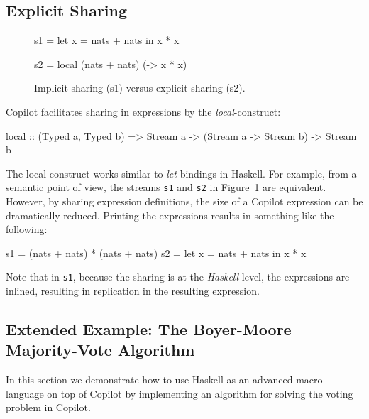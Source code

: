 \subsection{Explicit Sharing}
\label{sec:explicit_sharing}

\begin{figure}[ht]
\begin{minipage}{0.25\textwidth}
\begin{code}
s1 = let x = nats + nats
     in x * x
\end{code}
\end{minipage}%
\begin{minipage}{0.25\textwidth}
\begin{code}
s2 = local (nats + nats)
      (\x -> x * x)
\end{code}
\end{minipage}
\caption{Implicit sharing (s1) versus explicit sharing (s2).}
\label{fig:explicit_sharing}
\end{figure}

\noindent Copilot facilitates sharing in expressions by the \emph{local}-construct:
%
\begin{code}
local
  :: (Typed a, Typed b)
  => Stream a
  -> (Stream a -> Stream b)
  -> Stream b
\end{code}
%
The local construct works similar to \emph{let}-bindings in Haskell.  For
example, from a semantic point of view, the streams {\tt s1} and {\tt s2} in
Figure~\ref{fig:explicit_sharing} are equivalent.  However, by sharing
expression definitions, the size of a Copilot expression can be dramatically
reduced.  Printing the expressions results in something like the following:
%
\begin{code}
s1 = (nats + nats) * (nats + nats)
s2 = let x = nats + nats in
     x * x
\end{code}
%
\noindent
Note that in {\tt s1}, because the sharing is at the \emph{Haskell} level, the
expressions are inlined, resulting in replication in the resulting expression.

\subsection{Extended Example: The Boyer-Moore Majority-Vote Algorithm}
\label{subsec:boyer_moore}

In this section we demonstrate how to use Haskell as an advanced macro language
on top of Copilot by implementing an algorithm for solving the voting problem
in Copilot.

